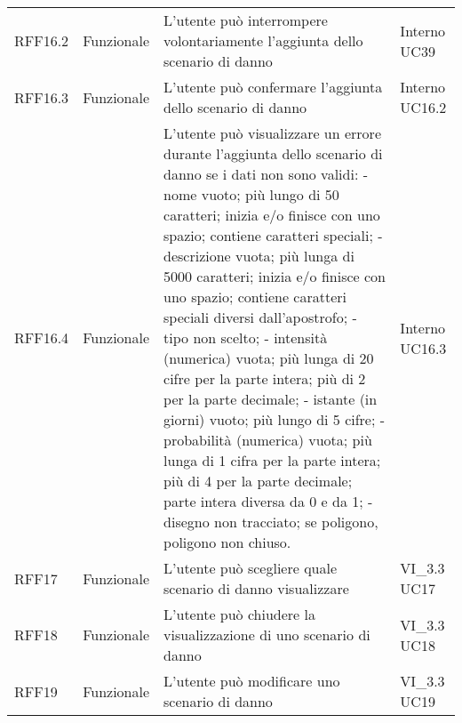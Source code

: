 \begin{longtable}{p{2cm}!{\VRule[1pt]}p{2cm}!{\VRule[1pt]}p{5cm}!{\VRule[1pt]}p{1.5cm}}
	RFF16.2                          & Funzionale\newline               & L'utente può interrompere volontariamente l'aggiunta dello scenario di danno                                             & Interno \newline UC39        
	\\
	RFF16.3                          & Funzionale\newline               & L'utente può confermare l'aggiunta dello scenario di danno                                                               & Interno \newline UC16.2      
	\\
	RFF16.4 &Funzionale\newline  & L'utente può visualizzare un errore durante l'aggiunta dello scenario di danno se i dati non sono validi:
	- nome vuoto; più lungo di 50 caratteri; inizia e/o
	finisce con uno spazio; contiene caratteri speciali;
	- descrizione vuota; più lunga di 5000 caratteri;
	inizia e/o finisce con uno spazio; contiene
	caratteri speciali diversi dall'apostrofo;
	- tipo non scelto;
	- intensità (numerica) vuota; più lunga di 20 cifre per la
	parte intera; più di 2 per la parte decimale;
	- istante (in giorni) vuoto; più lungo di 5 cifre;
	- probabilità (numerica) vuota; più lunga di 1 cifra per la
	parte intera; più di 4 per la parte decimale; parte
	intera diversa da 0 e da 1;
	- disegno non tracciato; se poligono, poligono non
	chiuso. & Interno \newline UC16.3
	\\
	RFF17                            & Funzionale\newline               & L'utente può scegliere quale scenario di danno visualizzare                                                              & VI_3.3 \newline UC17         
	\\
	RFF18                            & Funzionale\newline               & L'utente può chiudere la visualizzazione di uno scenario di danno                                                        & VI_3.3 \newline UC18         
	\\
	RFF19                            & Funzionale\newline               & L'utente può modificare uno scenario di danno                                                                            & VI_3.3 \newline UC19         

\end{longtable}

